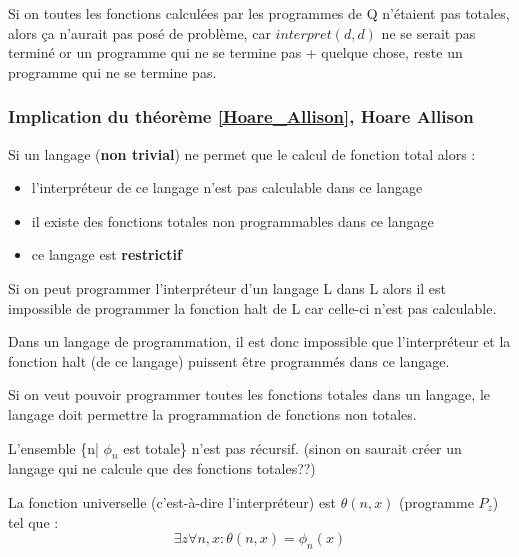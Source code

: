 \begin{myrem}
	Si on toutes les fonctions calculées par les programmes de Q n'étaient
	pas totales, alors ça n'aurait pas posé de problème, car $interpret(d,d)$
	ne se serait pas terminé or un programme qui ne se termine pas +
	quelque chose, reste un programme qui ne se termine pas.
\end{myrem}



\subsubsection{Implication du théorème \ref{Hoare_Allison}, Hoare Allison }

\begin{myprop}
	Si un langage (\textbf{non trivial}) ne permet que le calcul de fonction total alors :
	\begin{itemize}
		\item l'interpréteur de ce langage n'est pas calculable dans ce langage
		\item il existe des fonctions totales non programmables dans ce langage
		\item ce langage est \bf{restrictif}
	\end{itemize}
\end{myprop}
	
\begin{myprop}
	Si on peut programmer l'interpréteur d'un langage L dans L alors il est
	impossible de programmer la fonction halt de L car celle-ci n'est pas calculable. 
\end{myprop}

\begin{myprop}
	Dans un langage de programmation, il est donc impossible que 
	l'interpréteur et la fonction halt (de ce langage) puissent être programmés dans ce langage.
\end{myprop}

\begin{myprop}
	Si on veut pouvoir programmer toutes les fonctions 
	totales dans un langage, le langage doit permettre la programmation de 
	fonctions non totales.
\end{myprop}

\begin{myprop}
	L'ensemble \{n| $\phi_n$ est totale\} n'est pas récursif. (sinon on 
	saurait créer un langage qui ne calcule que des fonctions totales??)
\end{myprop}

\begin{mytheo}
	La fonction universelle (c'est-à-dire l'interpréteur) est $\theta(n,x)$ (programme $P_z$) tel que :
	\[ \exists z \forall n,x : \theta(n,x) = \phi_n(x)\]	
\end{mytheo}

